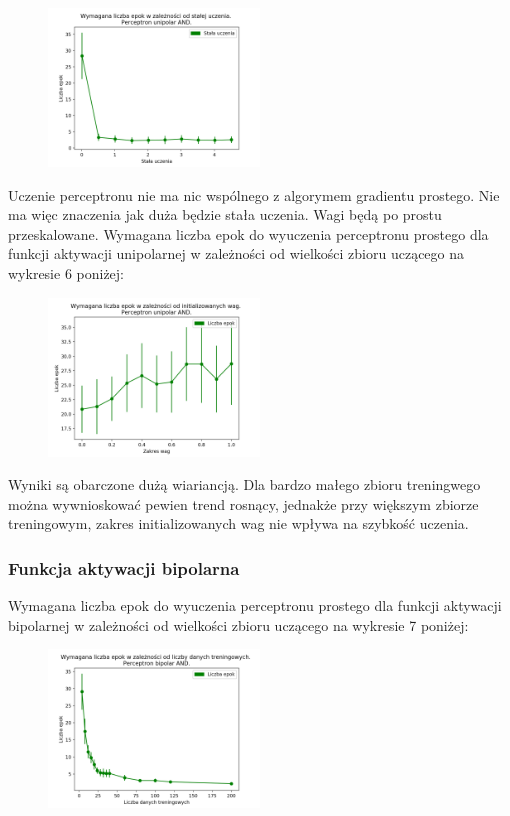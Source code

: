 \documentclass{article}
\begin{document}
	\begin{figure}[h]
		\centering
		\caption{}
		\includegraphics[width=0.5\textwidth]{epoki_rate_perceptron_unipolar.png}
	\end{figure}
	
	Uczenie perceptronu nie ma nic wspólnego z algorymem gradientu prostego. Nie ma więc znaczenia jak duża będzie stała uczenia. Wagi będą po prostu przeskalowane.
	\newpage
		Wymagana liczba epok do wyuczenia perceptronu prostego dla funkcji aktywacji unipolarnej w zależności od wielkości zbioru uczącego na wykresie 6 poniżej:
	
	\begin{figure}[h]
		\centering
		\caption{}
		\includegraphics[width=0.5\textwidth]{epoki_wagi_perceptron_unipolar.png}
	\end{figure}
	
	Wyniki są obarczone dużą wiariancją. Dla bardzo małego zbioru treningwego można wywnioskować pewien trend rosnący, jednakże przy większym zbiorze treningowym, zakres initializowanych wag nie wpływa na szybkość uczenia.
	\newpage
	\subsubsection{Funkcja aktywacji bipolarna}
	Wymagana liczba epok do wyuczenia perceptronu prostego dla funkcji aktywacji bipolarnej w zależności od wielkości zbioru uczącego na wykresie 7 poniżej:
	\begin{figure}[h]
		\centering
		\caption{}
		\includegraphics[width=0.5\textwidth]{epoki_date_perceptron_bipolar.png}
	\end{figure}
\end{document}
